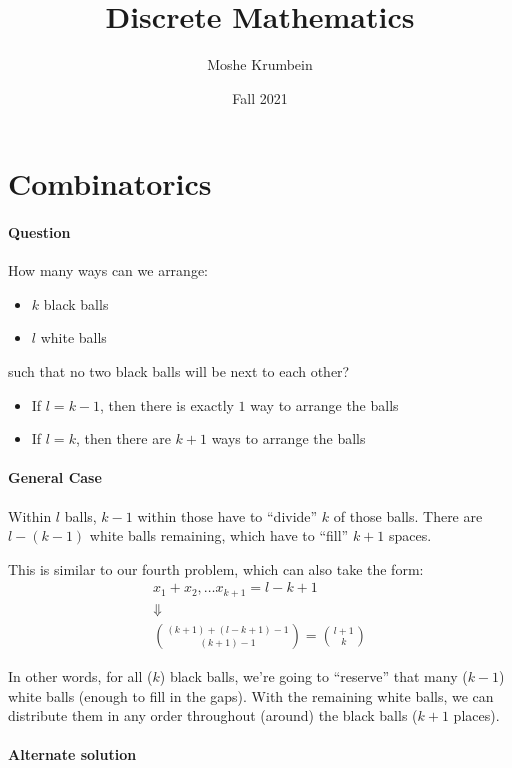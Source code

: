 \documentclass[00_complete]{subfiles}
\title{Discrete Mathematics}
\author{Moshe Krumbein}
\date{Fall 2021}
\begin{document}

\section{Combinatorics}

\paragraph{Question}

How many ways can we arrange:

\begin{itemize}
\item $k$ black balls
\item $l$ white balls
\end{itemize}

such that no two black balls will be next to each other?

\begin{itemize}
 \item If $l=k-1$, then there is exactly $1$ way to arrange the balls
 \item If $l = k$, then there are $k+1$ ways to arrange the balls
\end{itemize}

\paragraph{General Case}

Within $l$ balls, $k-1$ within those have to ``divide'' $k$ of those balls. There
are $l-(k-1)$ white balls remaining, which have to ``fill'' $k+1$ spaces.

This is similar to our fourth problem, which can also take the form:
\begin{gather*}
    x_1+x_2, \dots x_{k+1} = l-k+1 \\
    \Downarrow \\
    \binom{(k+1)+(l-k+1)-1}{(k+1)-1} = \binom{l+1}{k}
\end{gather*}

In other words, for all ($k$) black balls, we're going to ``reserve'' that many
($k-1$) white balls (enough to fill in the gaps). With the remaining white balls, we can
distribute them in any order throughout (around) the black balls ($k+1$
places).

\paragraph{Alternate solution}
\end{document}
